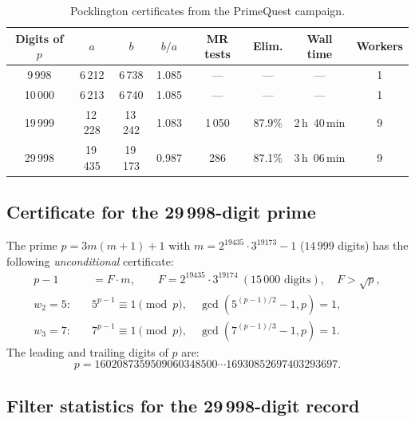 \documentclass[11pt,a4paper]{article}
\theoremstyle{plain}
\theoremstyle{definition}
\begin{document}
\begin{table}[ht]
\centering
\caption{Pocklington certificates from the PrimeQuest campaign.}
\label{tab:certificates}
\begin{tabular}{c c c c c c c c}
\toprule
Digits of $p$ & $a$ & $b$ & $b/a$ & MR tests & Elim. & Wall time & Workers \\
\midrule
9\,998   & 6\,212  & 6\,738  & 1.085 & ---    & ---    & ---           & 1 \\
10\,000  & 6\,213  & 6\,740  & 1.085 & ---    & ---    & ---           & 1 \\
19\,999  & 12\,228 & 13\,242 & 1.083 & 1\,050 & 87.9\% & 2\,h~40\,min  & 9 \\
29\,998  & 19\,435 & 19\,173 & 0.987 & 286    & 87.1\% & 3\,h~06\,min  & 9 \\
\bottomrule
\end{tabular}
\end{table}

\subsection{Certificate for the 29\,998-digit prime}

\begin{rigorousbox}
The prime $p = 3m(m+1) + 1$ with $m = 2^{19435} \cdot 3^{19173} - 1$
($14\,999$ digits) has the following \emph{unconditional} certificate:
\begin{align*}
p - 1 &= F \cdot m, \qquad F = 2^{19435} \cdot 3^{19174}\ (15\,000 \text{ digits}),
\quad F > \sqrt{p}, \\
w_2 = 5: \quad & 5^{p-1} \equiv 1 \pmod{p}, \quad \gcd(5^{(p-1)/2} - 1, p) = 1, \\
w_3 = 7: \quad & 7^{p-1} \equiv 1 \pmod{p}, \quad \gcd(7^{(p-1)/3} - 1, p) = 1.
\end{align*}
The leading and trailing digits of $p$ are:
\[
p = 1602087359509060348500 \cdots 16930852697403293697.
\]
\end{rigorousbox}

\subsection{Filter statistics for the 29\,998-digit record}
\end{document}
